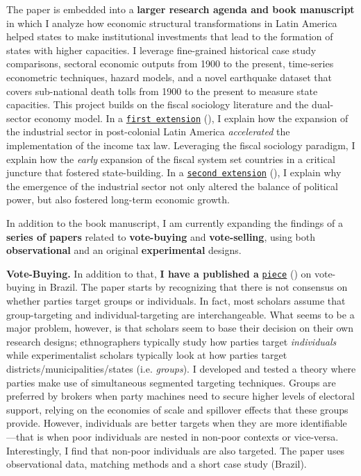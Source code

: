 The paper is embedded into a {\bf larger research agenda and book manuscript} in which I analyze how economic structural transformations in Latin America helped states to make institutional investments that lead to the formation of states with higher capacities. I leverage fine-grained historical case study comparisons, sectoral economic outputs from 1900 to the present, time-series econometric techniques, hazard models, and a novel earthquake dataset that covers sub-national death tolls from 1900 to the present to measure state capacities. This project builds on the fiscal sociology literature and the dual-sector economy model. In a \href{http://github.com/hbahamonde/IncomeTaxAdoption/raw/master/Bahamonde_IncomeTaxAdoption.pdf}{\texttt{first extension}} (\emph{\unskip}), I explain how the expansion of the industrial sector in post-colonial Latin America \emph{accelerated} the implementation of the income tax law. Leveraging the fiscal sociology paradigm, I explain how the \emph{early} expansion of the fiscal system set countries in a critical juncture that fostered state-building. In a \href{https://github.com/hbahamonde/Negative_Link_Paper/raw/master/Bahamonde_NegativeLink.pdf}{\texttt{second extension}} (\emph{\unskip}), I explain why the emergence of the industrial sector not only altered the balance of political power, but also fostered long-term economic growth. 

In addition to the book manuscript, I am currently expanding the findings of a {\bf series of papers} related to {\bf vote-buying} and {\bf vote-selling}, using both {\bf observational} and an original {\bf experimental} designs. 


{\bf Vote-Buying.} In addition to that, {\bf I have a published a} \href{https://github.com/hbahamonde/Clientelism_paper/raw/master/Bahamonde_Clientelism_Paper_Journal.pdf}{\texttt{piece}} (\emph{\unskip}) on vote-buying in Brazil. The paper starts by recognizing that there is not consensus on whether parties target groups or individuals. In fact, most scholars assume that group-targeting and individual-targeting are interchangeable. What seems to be a major problem, however, is that scholars seem to base their decision on their own research designs; ethnographers typically study how parties target \emph{individuals} while experimentalist scholars typically look at how parties target districts/municipalities/states (i.e. \emph{groups}). I developed and tested a theory where parties make use of simultaneous segmented targeting techniques. Groups are preferred by brokers when party machines need to secure higher levels of electoral support, relying on the economies of scale and spillover effects that these groups provide. However, individuals are better targets when they are more identifiable---that is when poor individuals are nested in non-poor contexts or vice-versa. Interestingly, I find that non-poor individuals are also targeted. The paper uses observational data, matching methods and a short case study (Brazil).



